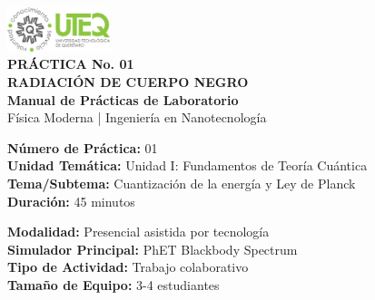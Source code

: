 \documentclass[12pt,a4paper]{article}
\newcommand{\practicenumber}{01}
\newcommand{\practicetitle}{RADIACIÓN DE CUERPO NEGRO}
\newcommand{\practiceunit}{Unidad I: Fundamentos de Teoría Cuántica}
\newcommand{\practicesubtopic}{Cuantización de la energía y Ley de Planck}
\newcommand{\practiceduration}{45 minutos}
\newcommand{\practicemodality}{Presencial asistida por tecnología}
\newcommand{\practicesimulator}{PhET Blackbody Spectrum}
\begin{document}
	
	
	\begin{center}
		\includegraphics[width=3cm]{../../Imagenes/Logo_uteq}\\[0.3cm]
		
		{\LARGE \textcolor{uteqblue}{\textbf{PRÁCTICA No. \practicenumber}}}\\[0.2cm]
		{\Huge \textcolor{uteqblue}{\textbf{\practicetitle}}}\\[0.3cm]
		{\large \textcolor{uteqgray}{\textbf{Manual de Prácticas de Laboratorio}}}\\[0.2cm]
		{\normalsize \textcolor{uteqgray}{Física Moderna | Ingeniería en Nanotecnología}}\\[0.5cm]
	\end{center}
	
	
	\begin{datosgeneralesbox}
		\begin{multicols}{2}
			\textbf{Número de Práctica:} \practicenumber\\
			\textbf{Unidad Temática:} \practiceunit\\
			\textbf{Tema/Subtema:} \practicesubtopic\\
			\textbf{Duración:} \practiceduration\\
			
			\columnbreak
			
			\textbf{Modalidad:} \practicemodality\\
			\textbf{Simulador Principal:} \practicesimulator\\
			\textbf{Tipo de Actividad:} Trabajo colaborativo\\
			\textbf{Tamaño de Equipo:} 3-4 estudiantes\\
		\end{multicols}
	\end{datosgeneralesbox}
	
	
\end{document}

